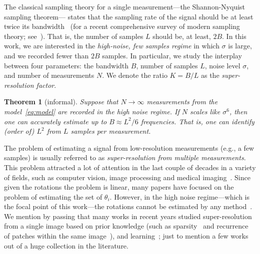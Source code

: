 \documentclass[english,12pt]{article}
\newcommand{\tB}{B}
\newtheorem{thm}{Theorem}
\numberwithin{equation}{section}
\numberwithin{thm}{section} %
\begin{document}
The classical sampling theory for a single measurement---the Shannon-Nyquist sampling theorem--- states that the sampling rate of the signal should be at least twice its bandwidth~\cite{shannon1949communication} (for a recent comprehensive survey of modern sampling theory; see~\cite{eldar2015sampling}).
That is, the number of samples $L$ should be, at least, $2\tB$. 
In this work, we are interested in  the \emph{high-noise, few samples regime}  in which $\sigma$ is large, and  we recorded  fewer than $2\tB$ samples. In particular, we study the interplay between four parameters: the bandwidth $\tB$, number of samples $L$, noise level $\sigma$, and number of measurements $N$. We denote the ratio $K=\tB/L$ as the \emph{super-resolution factor}.

\begin{thm}[informal]
	Suppose that $N\to\infty$ measurements from the model~\eqref{eq:model} are recorded in the high noise regime. If $N$ scales like $\sigma^6$, then one can accurately estimate up to $B\approx L^2/6$ frequencies. That is, one can identify (order of) $L^2$ from $L$ samples per measurement. 
\end{thm}

The problem of estimating a signal from low-resolution measurements (e.g., a few samples) is usually referred to as \emph{super-resolution from multiple measurements}. This problem attracted a lot of attention in the last couple of decades in a variety of fields, such as computer vision, image processing and medical imaging~\cite{park2003super,farsiu2004advances, greenspan2008super}.
Since given the rotations the problem is linear, many papers have focused on the problem of estimating the set of $\theta_i$. However, in the high noise regime---which is the focal point of this work---the rotations cannot be estimated by any method~\cite{bendory2018toward,aguerrebere2016fundamental}. 
We mention by passing that many works in recent years studied super-resolution from a single image based on prior knowledge (such as sparsity~\cite{huang2009super,candes2014towards} and recurrence of patches within the same image~\cite{glasner2009super}),
and learning~\cite{lim2017enhanced}; just to mention a few works out of a huge collection in the literature. 
\end{document}
